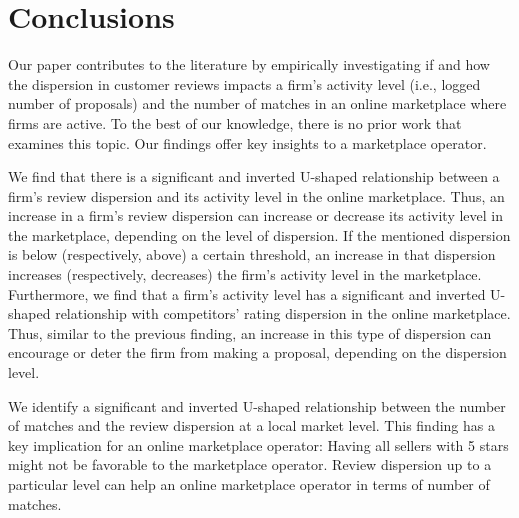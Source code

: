 \documentclass[msom,blindrev]{informs3}
\begin{document}
	
	
	
	
	
	
	
\section{Conclusions}

Our paper contributes to the literature by empirically investigating if and how the dispersion in customer reviews impacts a firm's activity level (i.e., logged number of proposals) and the number of matches in an online marketplace where firms are active. To the best of our knowledge, there is no prior work that examines this topic. Our findings offer key insights to a marketplace operator.

We find that there is a significant and inverted U-shaped relationship between a firm's review dispersion and its activity level in the online marketplace. Thus, an increase in a firm's review dispersion can increase or decrease its activity level in the marketplace, depending on the level of dispersion. If the mentioned dispersion is below (respectively, above) a certain threshold, an increase in that dispersion increases (respectively, decreases) the firm's activity level in the marketplace. Furthermore, we find that a firm's activity level  has a significant and inverted U-shaped relationship with competitors' rating dispersion in the online marketplace. Thus, similar to the previous finding, an increase in this type of dispersion can encourage or deter the firm from making a proposal, depending on the dispersion level.

We identify a significant and inverted U-shaped relationship between the number of matches and the review dispersion at a local market level. This finding has a key implication for an online marketplace operator: Having all sellers with 5 stars might not be favorable to the marketplace operator. Review dispersion up to a particular level can help an online marketplace operator in terms of number of matches.
\end{document}
